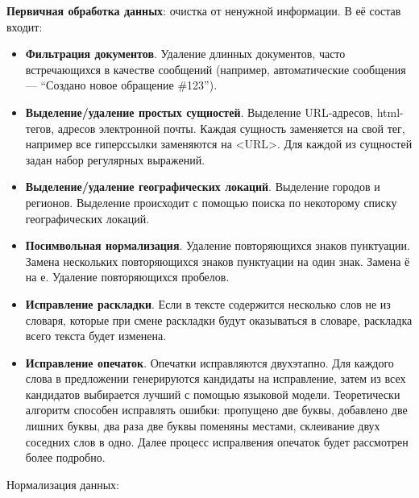 \textbf{Первичная обработка данных}: очистка от ненужной информации. В её состав входит:
\begin{itemize}
    \item  \textbf{Фильтрация документов}. Удаление длинных документов, часто встречающихся в качестве сообщений (например, автоматические сообщения — ``Создано новое обращение \#123''). 
    \item \textbf{Выделение/удаление простых сущностей}. Выделение URL-адресов, html-тегов, адресов электронной почты. Каждая сущность заменяется на свой тег, например все гиперссылки заменяются на <URL>. Для каждой из сущностей задан набор регулярных выражений.
\item \textbf{Выделение/удаление географических локаций}. Выделение городов и регионов. Выделение происходит с помощью поиска по некоторому списку географических локаций.
\item \textbf{Посимвольная нормализация}. Удаление повторяющихся знаков пунктуации. Замена нескольких повторяющихся знаков пунктуации на один знак. Замена ё на е. Удаление повторяющихся пробелов.
\item \textbf{Исправление раскладки}. Если в тексте содержится несколько слов не из словаря, которые при смене раскладки будут оказываться в словаре, раскладка всего текста будет изменена.
\item \textbf{Исправление опечаток}. Опечатки исправляются двухэтапно. Для каждого слова в предложении генерируются кандидаты на исправление, затем из всех кандидатов выбирается лучший с помощью языковой модели. Теоретически алгоритм способен исправлять ошибки: пропущено две буквы, добавлено две лишних буквы, два раза две буквы поменяны местами, склеивание двух соседних слов в одно. Далее процесс испралвения опечаток будет рассмотрен более подробно.
\end{itemize}

Нормализация данных:

